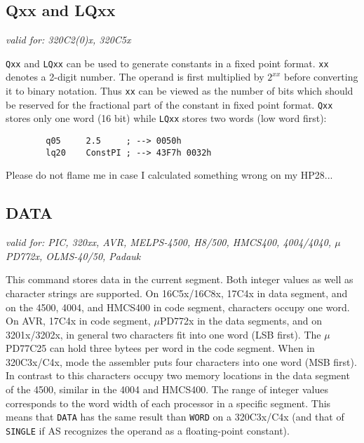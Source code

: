 \documentclass[12pt,twoside]{report}
\makeatletter
\newcommand{\tty}[1]{{\tt #1}}
\newcommand{\ttindex}[1]{\index{#1@{\tt #1}}}
\newcommand{\asname}{{AS}}
\makeatother
\begin{document}

\subsection{Qxx and LQxx}
\ttindex{Qxx}\ttindex{LQxx}

{\em valid for: 320C2(0)x, 320C5x}

\tty{Qxx} and \tty{LQxx} can be used to generate constants in a fixed
point format. \tty{xx} denotes a 2-digit number.  The operand is first
multiplied by $2^{xx}$ before converting it to binary notation.  Thus
\tty{xx} can be viewed as the number of bits which should be reserved for
the fractional part of the constant in fixed point format.  \tty{Qxx}
stores only one word (16 bit) while \tty{LQxx} stores two words (low word
first):
\begin{verbatim}
        q05     2.5     ; --> 0050h
        lq20    ConstPI ; --> 43F7h 0032h
\end{verbatim}
Please do not flame me in case I calculated something wrong on my
HP28...


\subsection{DATA}
\ttindex{DATA}

{\em valid for: PIC, 320xx, AVR, MELPS-4500, H8/500,
     HMCS400, 4004/4040, $\mu$PD772x, OLMS-40/50, Padauk}

This command stores data in the current segment.  Both integer
values as well as character strings are supported.  On
16C5x/16C8x, 17C4x in data segment, and on the 4500, 4004, and
HMCS400 in code segment, characters occupy one word.  On AVR,
17C4x in code segment, $\mu$PD772x in the data segments, and on
3201x/3202x, in general two characters fit into one word (LSB
first).  The $\mu$PD77C25 can hold three bytees per word in the
code segment.  When in 320C3x/C4x, mode the assembler puts four
characters into one word (MSB first).  In contrast to this
characters occupy two memory locations in the data segment of the
4500, similar in the 4004 and HMCS400.  The range of integer
values corresponds to the word width of each processor in a
specific segment.  This means that \tty{DATA} has the same result
than \tty{WORD} on a 320C3x/C4x (and that of \tty{SINGLE} if \asname{}
recognizes the operand as a floating-point constant).
\end{document}
